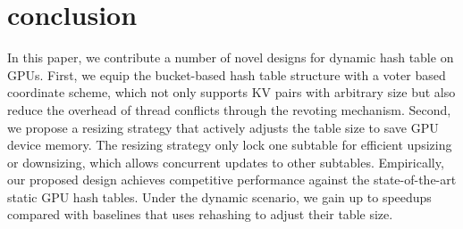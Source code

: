 \section{conclusion}\label{sec:con}
In this paper, we contribute a number of novel designs for dynamic hash table on GPUs. 
First, we equip the bucket-based hash table structure with a voter based coordinate scheme, 
which not only supports KV pairs with arbitrary size but also reduce the overhead of thread conflicts through the revoting mechanism. 
Second, we propose a resizing strategy that actively adjusts the table size to save GPU device memory. The resizing strategy only lock one subtable for efficient upsizing or downsizing, which allows concurrent updates to other subtables. Empirically, our proposed design achieves competitive performance against the state-of-the-art static GPU hash tables. Under the dynamic scenario, we gain up to \xxx speedups compared with baselines that uses rehashing to adjust their table size. 

 